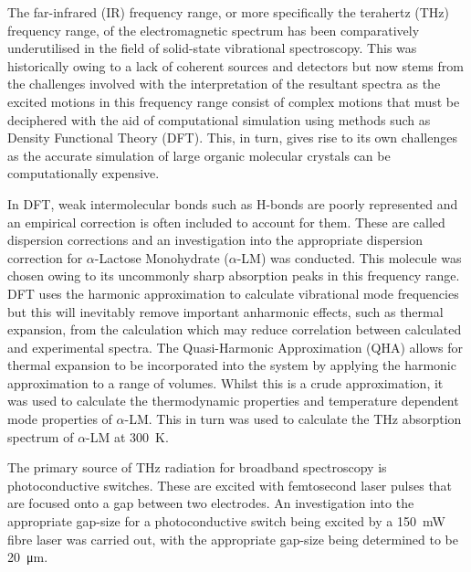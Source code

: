 The far-infrared (IR) frequency range, or more specifically the terahertz (THz) frequency range, of the electromagnetic spectrum has been comparatively underutilised in the field of solid-state vibrational spectroscopy. This was historically owing to a lack of coherent sources and detectors but now stems from the challenges involved with the interpretation of the resultant spectra as the excited motions in this frequency range consist of complex motions that must be deciphered with the aid of computational simulation using methods such as Density Functional Theory (DFT). This, in turn, gives rise to its own challenges as the accurate simulation of large organic molecular crystals can be computationally expensive. 

In DFT, weak intermolecular bonds such as H-bonds are poorly represented and an empirical correction is often included to account for them. These are called dispersion corrections and an investigation into the appropriate dispersion correction for \(\alpha\)-Lactose Monohydrate (\(\alpha\)-LM) was conducted. This molecule was chosen owing to its uncommonly sharp absorption peaks in this frequency range. DFT uses the harmonic approximation to calculate vibrational mode frequencies but this will inevitably remove important anharmonic effects, such as thermal expansion, from the calculation which may reduce correlation between calculated and experimental spectra. The Quasi-Harmonic Approximation (QHA) allows for thermal expansion to be incorporated into the system by applying the harmonic approximation to a range of volumes. Whilst this is a crude approximation, it was used to calculate the thermodynamic properties and temperature dependent mode properties of \(\alpha\)-LM. This in turn was used to calculate the THz absorption spectrum of \(\alpha\)-LM at \SI{300}{K}.

The primary source of THz radiation for broadband spectroscopy is photoconductive switches. These are excited with femtosecond laser pulses that are focused onto a gap between two electrodes. An investigation into the appropriate gap-size for a photoconductive switch being excited by a \SI{150}{mW} fibre laser was carried out, with the appropriate gap-size being determined to be \SI{20}{\micro\metre}.
